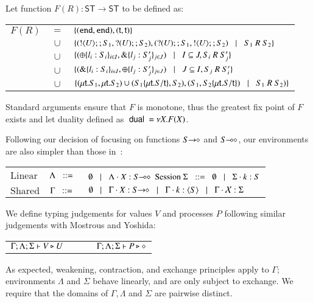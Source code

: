 \begin{definition}[Duality]
	Let function $F(R): \mathsf{ST} \longrightarrow \mathsf{ST}$ to be defined as:

	\begin{tabular}{rcl}
		$F(R)$ &$=$&		$\{(\mathtt{end}, \mathtt{end}), (\mathsf{t}, \mathsf{t})\}$\\
			&$\cup$&	$\{(! \langle U \rangle ;;S_1, ? (U) ;; S_2), (? (U) ;;S_1, ! \langle U \rangle ;; S_2) \;\;\;|\;\;\; S_1\ R\ S_2\}$\\
			&$\cup$&	$\{(\oplus \{l_i: S_i\}_{i \in I}, \& \{l_j: S_j'\}_{j \in J}) \;\;\;|\;\;\; I \subseteq J, S_i\ R\ S_j'\}$\\
			&$\cup$&	$\{(\& \{l_i: S_i\}_{i \in I}, \oplus \{l_j: S_j'\}_{j \in J}) \;\;\;|\;\;\; J \subseteq I, S_j\ R\ S_i'\}$\\
			&$\cup$&	$\{(\mu\mathsf{t}.S_1, \mu\mathsf{t}.S_2) \cup (S_1 \{\mu\mathsf{t}.S/\mathsf{t} \}, S_2), (S_1, S_2\{\mu\mathsf{t}.S/\mathsf{t} \}) \;\;\;|\;\;\; S_1\ R\ S_2)\}$
	\end{tabular}

	Standard arguments ensure that $F$ is monotone, thus the greatest fix point
	of $F$ exists and let duality defined as $\ \mathsf{dual}\  = \nu X. F(X)$.
\end{definition}

Following our decision of focusing on functions $S\!\! \rightarrow\!\! \diamond$ and $S\!\! \multimap\!\! \diamond$,
our environments are also simpler than those in~\cite{tlca07}:

\begin{tabular}{lcl}
	$\text{Linear}$ & $\Lambda \;\;::=\;\;$ & $\emptyset \;\;\;|\;\;\; \Lambda \cdot X: S\!\! \multimap\!\! \diamond$ \qquad \qquad
	$\text{Session} \ \Sigma \;\;::=\;\; \emptyset \;\;\;|\;\;\; \Sigma \cdot k:S$
	\\
	$\text{Shared}$ & $\Gamma \;\;::=\;\;$ & $\emptyset \;\;\;|\;\;\; \Gamma \cdot X: S\!\! \rightarrow\!\! \diamond \;\;\;|\;\;\; \Gamma \cdot k: \langle S \rangle \;\;\;|\;\;\; \Gamma \cdot \mathcal{X}: \Sigma$
\end{tabular}

We define typing judgements for values $V$ and processes $P$ following similar
judgements with Mostrous and Yoshida:
\begin{center}
	\begin{tabular}{c}
	 $\Gamma; \Lambda; \Sigma \vdash V \triangleright U \qquad \qquad \Gamma; \Lambda; \Sigma \vdash P \triangleright \diamond$
	\end{tabular}
\end{center}
As expected, weakening, contraction, and exchange principles apply to $\Gamma$;
environments $\Lambda$ and $\Sigma$ behave linearly, and are only subject to exchange.
We require that the domains of $\Gamma, \Lambda$ and $\Sigma$ are pairwise distinct.

